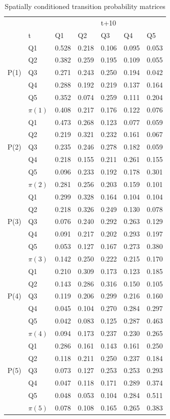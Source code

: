 \documentclass[11pt, titlepage]{article}
\begin{document}
\begin{table}
  \centering
  \small
\begin{tabular}{|ll|lllll|}\hline
    & & & & t+10& & \\
    & t& Q1& Q2& Q3& Q4& Q5\\
    \hline
    & Q1&  0.528& 0.218& 0.106& 0.095& 0.053\\
    & Q2&  0.382& 0.259& 0.195& 0.109& 0.055\\
P(1)& Q3&  0.271& 0.243& 0.250& 0.194& 0.042\\
    & Q4&  0.288& 0.192& 0.219& 0.137& 0.164\\
    & Q5&  0.352& 0.074& 0.259& 0.111& 0.204\\
    \hline
    & $\pi(1)$& 0.408& 0.217& 0.176& 0.122& 0.076\\
    \hline
    & Q1& 0.473& 0.268& 0.123& 0.077& 0.059\\
    & Q2& 0.219& 0.321& 0.232& 0.161& 0.067\\
P(2)& Q3& 0.235& 0.246& 0.278& 0.182& 0.059\\
    & Q4& 0.218& 0.155& 0.211& 0.261& 0.155\\
    & Q5& 0.096& 0.233& 0.192& 0.178& 0.301\\
    \hline
    & $\pi(2)$& 0.281& 0.256& 0.203& 0.159& 0.101\\
    \hline
    & Q1& 0.299& 0.328& 0.164& 0.104& 0.104\\
    & Q2& 0.218& 0.326& 0.249& 0.130& 0.078\\
P(3)& Q3& 0.076& 0.240& 0.292& 0.263& 0.129\\
    & Q4& 0.091& 0.217& 0.202& 0.293& 0.197\\
    & Q5& 0.053& 0.127& 0.167& 0.273& 0.380\\
    \hline
    & $\pi(3)$& 0.142& 0.250& 0.222& 0.215& 0.170\\
    \hline
    & Q1& 0.210& 0.309& 0.173& 0.123& 0.185\\
    & Q2& 0.143& 0.286& 0.316& 0.150& 0.105\\
P(4)& Q3& 0.119& 0.206& 0.299& 0.216& 0.160\\
    & Q4& 0.045& 0.104& 0.270& 0.284& 0.297\\
    & Q5& 0.042& 0.083& 0.125& 0.287& 0.463\\
    \hline
   & $\pi(4)$&  0.094& 0.173& 0.237& 0.230& 0.265\\
    \hline
    & Q1& 0.286& 0.161& 0.143& 0.161& 0.250\\
    & Q2& 0.118& 0.211& 0.250& 0.237& 0.184\\
P(5)& Q3& 0.073& 0.127& 0.253& 0.253& 0.293\\
    & Q4& 0.047& 0.118& 0.171& 0.289& 0.374\\
    & Q5& 0.048& 0.053& 0.104& 0.284& 0.511\\
    \hline
    & $\pi(5)$& 0.078& 0.108& 0.165& 0.265& 0.383\\
    \hline
\end{tabular}
\caption{Spatially conditioned transition probability matrices}
\label{t:sm}
\end{table}
\end{document}
